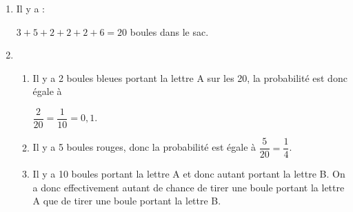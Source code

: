 
\medskip

%
 
\begin{enumerate}
\item %
Il y a :

$3 + 5 + 2 + 2 + 2 + 6 = 20$ boules dans le sac. 
\item %
	\begin{enumerate}
		\item %
Il y a 2 boules bleues portant la lettre A sur les 20, la probabilité est donc égale à 

$\dfrac{2}{20} = \dfrac{1}{10} = 0,1$. 		 
		\item %
Il y a 5 boules rouges, donc la probabilité est égale à $\dfrac{5}{20} = \dfrac{1}{4}$. 
		\item %
		Il y a 10 boules portant la lettre A et donc autant portant la lettre B. On a donc effectivement autant de chance de tirer une boule portant la lettre A que de tirer une boule portant la lettre B.
	\end{enumerate}
\end{enumerate}
 
\bigskip

